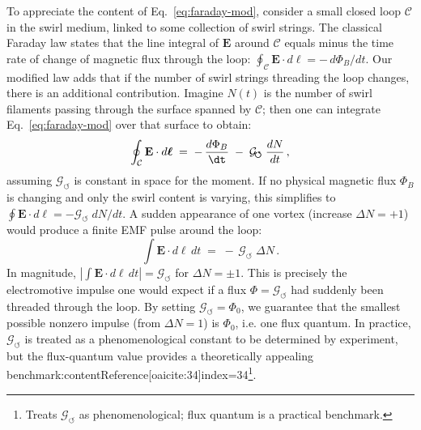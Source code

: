 \documentclass[12pt]{article}
\begin{document}
        To appreciate the content of Eq.~\eqref{eq:faraday-mod}, consider a small closed loop $\mathcal{C}$ in the swirl medium, linked to some collection of swirl strings. The classical Faraday law states that the line integral of $\mathbf{E}$ around $\mathcal{C}$ equals minus the time rate of change of magnetic flux through the loop: $\oint_{\mathcal{C}} \mathbf{E}\cdot d\boldsymbol{\ell} = -\,d\Phi_{B}/dt$. Our modified law adds that if the number of swirl strings threading the loop changes, there is an additional contribution. Imagine $N(t)$ is the number of swirl filaments passing through the surface spanned by $\mathcal{C}$; then one can integrate Eq.~\eqref{eq:faraday-mod} over that surface to obtain:
        \[
            \oint_{\mathcal{C}} \mathbf{E}\cdot d\boldsymbol{\ell} \;=\; -\,\frac{d\Phi_{B}}{\dt} \;-\; \mathcal{G}_{\!\boldsymbol{\circlearrowleft}}\;\frac{dN}{dt}\,,
        \]
        assuming $\mathcal{G}_{\!\boldsymbol{\circlearrowleft}}$ is constant in space for the moment. If no physical magnetic flux $\Phi_{B}$ is changing and only the swirl content is varying, this simplifies to $\oint \mathbf{E}\cdot d\ell = - \mathcal{G}_{\!\boldsymbol{\circlearrowleft}}\;dN/dt$. A sudden appearance of one vortex (increase $\Delta N=+1$) would produce a finite EMF pulse around the loop:
        \[
            \int \mathbf{E}\cdot d\ell\,dt \;=\; -\,\mathcal{G}_{\!\boldsymbol{\circlearrowleft}}\;\Delta N\,.
        \]
        In magnitude, $|\int \mathbf{E}\cdot d\ell\,dt| = \mathcal{G}_{\!\boldsymbol{\circlearrowleft}}$ for $\Delta N = \pm 1$. This is precisely the electromotive impulse one would expect if a flux $\Phi = \mathcal{G}_{\!\boldsymbol{\circlearrowleft}}$ had suddenly been threaded through the loop. By setting $\mathcal{G}_{\!\boldsymbol{\circlearrowleft}} = \Phi_{0}$, we guarantee that the smallest possible nonzero impulse (from $\Delta N=1$) is $\Phi_{0}$, i.e. one flux quantum. In practice, $\mathcal{G}_{\!\boldsymbol{\circlearrowleft}}$ is treated as a phenomenological constant to be determined by experiment, but the flux-quantum value provides a theoretically appealing benchmark:contentReference[oaicite:34]{index=34}\footnote{Treats $\mathcal G_{\!\circlearrowleft}$ as phenomenological; flux quantum is a practical benchmark.}.
\end{document}

